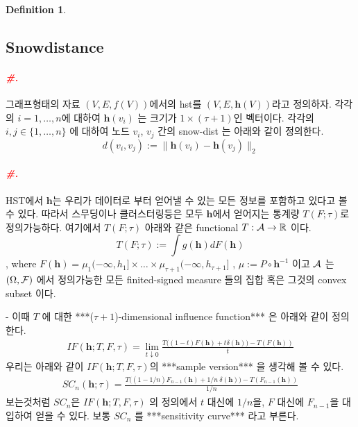 \documentclass[preprint, review, 12pt]{article}
\theoremstyle{definition}
\newtheorem{dfn}{Definition}
\theoremstyle{remark}
\def\shrp{\paragraph{\textcolor{red}{\textit{\#.}}}}
\begin{document}
\begin{dfn}
\end{dfn}
\subsection{Snowdistance} 

\shrp 그래프형태의 자료 $(V,E,f(V))$에서의 hst를 $(V,E,\boldsymbol{h}(V))$라고 정의하자. 각각의 $i=1,\dots,n$에 대하여 $\boldsymbol{h}(v_i)$ 는 크기가 $1\times (\tau+1)$인 벡터이다. 각각의 $i,j \in \{1,\dots,n\}$ 에 대하여 노드 $v_i$, $v_j$ 간의 snow-dist 는 아래와 같이 정의한다. 
\[
d(v_i,v_j) :=\|\boldsymbol{h}(v_i)-\boldsymbol{h}(v_j) \|_ 2
\]

\shrp HST에서 ${\boldsymbol h}$는 우리가 데이터로 부터 얻어낼 수 있는 모든 정보를 포함하고 있다고 볼 수 있다. 따라서 스무딩이나 클러스터링등은 모두 ${\boldsymbol h}$에서 얻어지는 통계량 $T(F;\tau)$로 정의가능하다. 여기에서 $T(F;\tau)$ 아래와 같은 functional $T:{\cal A} \to \mathbb{R}$ 이다. 
\[
T(F;\tau):=\int g({\boldsymbol h}) dF({\boldsymbol h})
\]
, where $F({\boldsymbol h})=\mu_1(-\infty,h_1]\times \dots \times \mu_{\tau+1}(-\infty,h_{\tau+1}]$ , $\mu:=P \circ {\boldsymbol h}^{-1}$ 이고 ${\cal A}$ 는 $(\Omega,{\cal F})$ 에서 정의가능한 모든 finited-signed measure 들의 집합 혹은 그것의 convex subset 이다. 

- 이때 $T$ 에 대한 ***($\tau+1$)-dimensional influence function*** 은 아래와 같이 정의한다. 
\begin{align}
IF({\boldsymbol h}; T,F,\tau)= \lim_{t\downarrow 0}\frac{T\Big((1-t)F(\boldsymbol{h}) + t \delta(\boldsymbol{h}) \Big)-T(F(\boldsymbol{h}))}{t}
\end{align}
우리는 아래와 같이 $IF({\boldsymbol h}; T,F,\tau)$의 ***sample version*** 을 생각해 볼 수 있다. 
\begin{align}
SC_{n}({\boldsymbol h};\tau)= \frac{T\Big((1-1/n)F_{n-1}(\boldsymbol{h}) + 1/n ~ \delta(\boldsymbol{h}) \Big)-T(F_{n-1}(\boldsymbol{h}))}{1/n}
\end{align}
보는것처럼 $SC_{n}$은 $IF({\boldsymbol h}; T,F,\tau)$ 의 정의에서 $t$ 대신에 $1/n$을, $F$ 대신에 $F_{n-1}$을 대입하여 얻을 수 있다. 보통 $SC_{n}$ 를 ***sensitivity curve*** 라고 부른다. 
\end{document}
